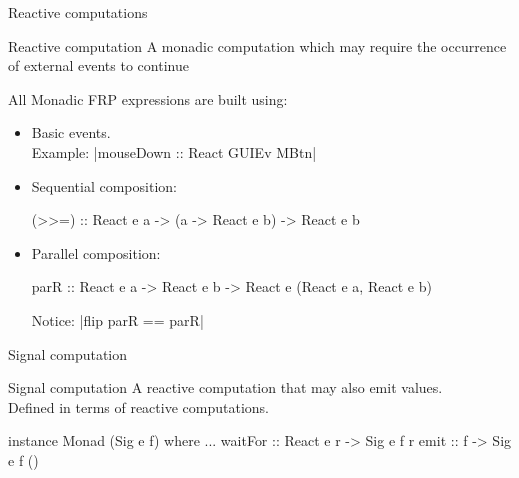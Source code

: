\documentclass{beamer}
\begin{document}
\newlength{\tmathindenta}
\setlength{\tmathindenta}{\mathindent}
\setlength{\mathindent}{0.05cm}


\begin{frame}{Reactive computations}

\begin{block}{Reactive computation}
A monadic computation which may require the occurrence of external events to continue
\end{block}

All Monadic FRP expressions are built using:
  \begin{itemize}
    \item Basic events.  \\
\vspace{0.3cm}
  Example: |mouseDown :: React GUIEv MBtn|
\vspace{0.3cm}
    \item Sequential composition:\\ 
 \begin{code}
    (>>=) :: React e a -> (a -> React e b) -> React e b
  \end{code}
\item Parallel composition:  \\
 \begin{code}
 parR :: React e a -> React e b -> React e (React e a, React e b)
\end{code}
Notice: |flip parR == parR|
\end{itemize}

\end{frame}



\begin{frame}{Signal computation}
\begin{block}{Signal computation}
A reactive computation that may also \alert{emit} values.\\
 Defined in terms of reactive computations.
\end{block}
\begin{code}
instance Monad (Sig e f) where ...
waitFor   :: React e r -> Sig e f r
emit      :: f -> Sig e f ()
\end{code}

\end{frame}
\end{document}
